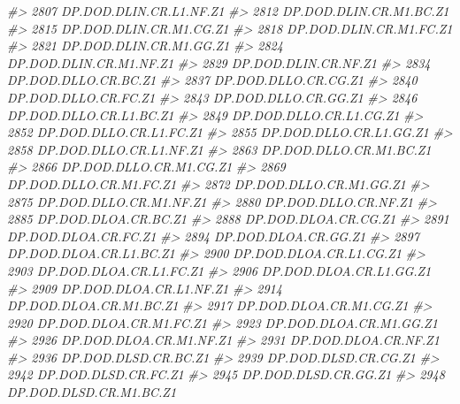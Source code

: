 \documentclass[
]{bxjsbook}
\newenvironment{Shaded}{\begin{snugshade}}{\end{snugshade}}
\newcommand{\CommentTok}[1]{\textcolor[rgb]{0.56,0.35,0.01}{\textit{#1}}}
\theoremstyle{definition}
\theoremstyle{definition}
\theoremstyle{definition}
\theoremstyle{definition}
\theoremstyle{remark}
\begin{document}
\begin{Shaded}
\begin{Highlighting}[]
\CommentTok{\#\textgreater{} 2807     DP.DOD.DLIN.CR.L1.NF.Z1}
\CommentTok{\#\textgreater{} 2812     DP.DOD.DLIN.CR.M1.BC.Z1}
\CommentTok{\#\textgreater{} 2815     DP.DOD.DLIN.CR.M1.CG.Z1}
\CommentTok{\#\textgreater{} 2818     DP.DOD.DLIN.CR.M1.FC.Z1}
\CommentTok{\#\textgreater{} 2821     DP.DOD.DLIN.CR.M1.GG.Z1}
\CommentTok{\#\textgreater{} 2824     DP.DOD.DLIN.CR.M1.NF.Z1}
\CommentTok{\#\textgreater{} 2829        DP.DOD.DLIN.CR.NF.Z1}
\CommentTok{\#\textgreater{} 2834        DP.DOD.DLLO.CR.BC.Z1}
\CommentTok{\#\textgreater{} 2837        DP.DOD.DLLO.CR.CG.Z1}
\CommentTok{\#\textgreater{} 2840        DP.DOD.DLLO.CR.FC.Z1}
\CommentTok{\#\textgreater{} 2843        DP.DOD.DLLO.CR.GG.Z1}
\CommentTok{\#\textgreater{} 2846     DP.DOD.DLLO.CR.L1.BC.Z1}
\CommentTok{\#\textgreater{} 2849     DP.DOD.DLLO.CR.L1.CG.Z1}
\CommentTok{\#\textgreater{} 2852     DP.DOD.DLLO.CR.L1.FC.Z1}
\CommentTok{\#\textgreater{} 2855     DP.DOD.DLLO.CR.L1.GG.Z1}
\CommentTok{\#\textgreater{} 2858     DP.DOD.DLLO.CR.L1.NF.Z1}
\CommentTok{\#\textgreater{} 2863     DP.DOD.DLLO.CR.M1.BC.Z1}
\CommentTok{\#\textgreater{} 2866     DP.DOD.DLLO.CR.M1.CG.Z1}
\CommentTok{\#\textgreater{} 2869     DP.DOD.DLLO.CR.M1.FC.Z1}
\CommentTok{\#\textgreater{} 2872     DP.DOD.DLLO.CR.M1.GG.Z1}
\CommentTok{\#\textgreater{} 2875     DP.DOD.DLLO.CR.M1.NF.Z1}
\CommentTok{\#\textgreater{} 2880        DP.DOD.DLLO.CR.NF.Z1}
\CommentTok{\#\textgreater{} 2885        DP.DOD.DLOA.CR.BC.Z1}
\CommentTok{\#\textgreater{} 2888        DP.DOD.DLOA.CR.CG.Z1}
\CommentTok{\#\textgreater{} 2891        DP.DOD.DLOA.CR.FC.Z1}
\CommentTok{\#\textgreater{} 2894        DP.DOD.DLOA.CR.GG.Z1}
\CommentTok{\#\textgreater{} 2897     DP.DOD.DLOA.CR.L1.BC.Z1}
\CommentTok{\#\textgreater{} 2900     DP.DOD.DLOA.CR.L1.CG.Z1}
\CommentTok{\#\textgreater{} 2903     DP.DOD.DLOA.CR.L1.FC.Z1}
\CommentTok{\#\textgreater{} 2906     DP.DOD.DLOA.CR.L1.GG.Z1}
\CommentTok{\#\textgreater{} 2909     DP.DOD.DLOA.CR.L1.NF.Z1}
\CommentTok{\#\textgreater{} 2914     DP.DOD.DLOA.CR.M1.BC.Z1}
\CommentTok{\#\textgreater{} 2917     DP.DOD.DLOA.CR.M1.CG.Z1}
\CommentTok{\#\textgreater{} 2920     DP.DOD.DLOA.CR.M1.FC.Z1}
\CommentTok{\#\textgreater{} 2923     DP.DOD.DLOA.CR.M1.GG.Z1}
\CommentTok{\#\textgreater{} 2926     DP.DOD.DLOA.CR.M1.NF.Z1}
\CommentTok{\#\textgreater{} 2931        DP.DOD.DLOA.CR.NF.Z1}
\CommentTok{\#\textgreater{} 2936        DP.DOD.DLSD.CR.BC.Z1}
\CommentTok{\#\textgreater{} 2939        DP.DOD.DLSD.CR.CG.Z1}
\CommentTok{\#\textgreater{} 2942        DP.DOD.DLSD.CR.FC.Z1}
\CommentTok{\#\textgreater{} 2945        DP.DOD.DLSD.CR.GG.Z1}
\CommentTok{\#\textgreater{} 2948     DP.DOD.DLSD.CR.M1.BC.Z1}

\end{Highlighting}
\end{Shaded}
\end{document}

